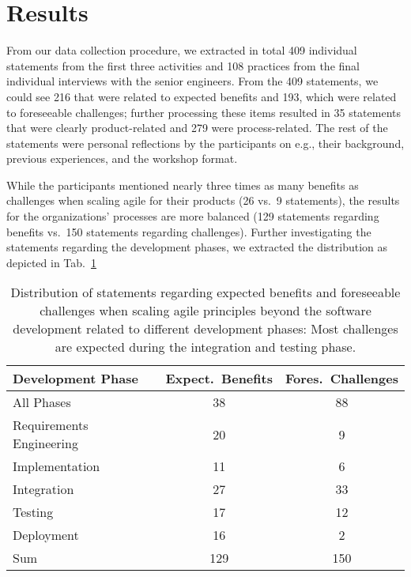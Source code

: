 \documentclass[10pt,a4paper]{IEEEtran} %
\begin{document}

\section{Results} %
\label{sec:results}

From our data collection procedure, we extracted in total 409 individual statements
from the first three activities and 108 practices from the final individual interviews with the senior engineers. 
From the 409 statements, we could see 216 that were related to expected benefits and 193, which were related to foreseeable challenges; further
processing these items resulted in 35 statements that were clearly product-related and 279 were process-related. The rest  of the statements were personal reflections by the participants on e.g., their background, previous experiences, and the workshop format.


While the participants mentioned nearly three times as many benefits as challenges when
scaling agile for 
their products (26 vs.~9 statements), the results for the organizations' processes are more balanced (129 statements regarding benefits vs.~150 statements regarding challenges).
Further investigating the statements regarding the development phases, we extracted the
distribution as depicted in Tab.~\ref{tab:distributionBenefitsChallenges}


\begin{table}[t]
\centering
\caption{Distribution of statements regarding expected benefits and foreseeable challenges when scaling agile principles beyond the software development related to different development phases: Most challenges are expected during the integration and testing phase.}
\label{tab:distributionBenefitsChallenges}
\begin{tabular}{lcc}
\hline
\textbf{Development Phase} & \textbf{Expect.~Benefits} & \textbf{Fores.~Challenges}\\
\hline
All Phases & 38 & 88 \\
Requirements Engineering & 20 & 9 \\
Implementation & 11 & 6 \\
Integration & 27 & 33 \\
Testing & 17 & 12 \\
Deployment & 16 & 2 \\
\hline
Sum & 129 & 150 \\
\hline
\end{tabular}
\end{table}
\end{document}
